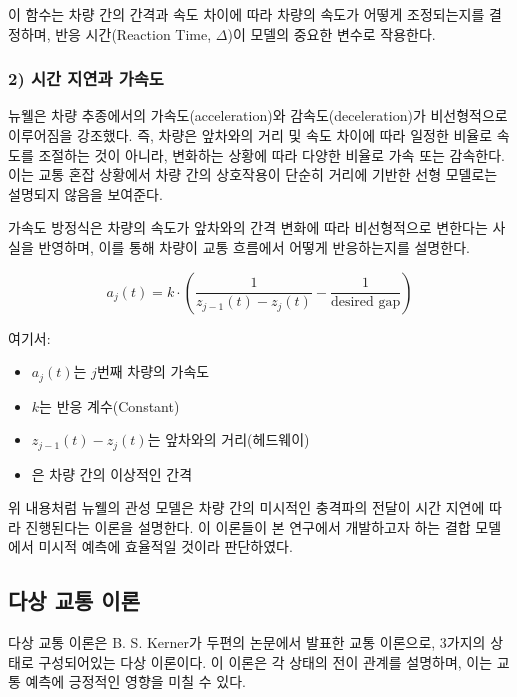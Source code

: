 \documentclass[11pt]{report}
\begin{document}
이 함수는 차량 간의 간격과 속도 차이에 따라 차량의 속도가 어떻게 조정되는지를 결정하며, 반응 시간(Reaction Time, $\Delta$)이 모델의 중요한 변수로 작용한다. 

\subsubsection*{2) 시간 지연과 가속도}
뉴웰은 차량 추종에서의 가속도(acceleration)와 감속도(deceleration)가 비선형적으로 이루어짐을 강조했다. 
즉, 차량은 앞차와의 거리 및 속도 차이에 따라 일정한 비율로 속도를 조절하는 것이 아니라, 변화하는 상황에 따라 다양한 비율로 가속 또는 감속한다. 
이는 교통 혼잡 상황에서 차량 간의 상호작용이 단순히 거리에 기반한 선형 모델로는 설명되지 않음을 보여준다.

가속도 방정식은 차량의 속도가 앞차와의 간격 변화에 따라 비선형적으로 변한다는 사실을 반영하며, 이를 통해 차량이 교통 흐름에서 어떻게 반응하는지를 설명한다.

$$
a_j(t) = k \cdot \left( \frac{1}{z_{j-1}(t) - z_j(t)} - \frac{1}{\text{desired gap}} \right)
$$

여기서:

\begin{itemize}
    \item $a_j(t)$는 $j$번째 차량의 가속도
    \item $k$는 반응 계수(Constant)
    \item $z_{j-1}(t) - z_j(t)$는 앞차와의 거리(헤드웨이)
    \item {}은 차량 간의 이상적인 간격
\end{itemize}

\indent 위 내용처럼 뉴웰의 관성 모델은 차량 간의 미시적인 충격파의 전달이 시간 지연에 따라 진행된다는 이론을 설명한다. 
이 이론들이 본 연구에서 개발하고자 하는 결합 모델에서 미시적 예측에 효율적일 것이라 판단하였다. 

\subsection{다상 교통 이론}
다상 교통 이론은 B. S. Kerner가 두편의 논문에서 발표한 교통 이론으로, 3가지의 상태로 구성되어있는 다상 이론이다. 
이 이론은 각 상태의 전이 관계를 설명하며, 이는 교통 예측에 긍정적인 영향을 미칠 수 있다. 
\end{document}
